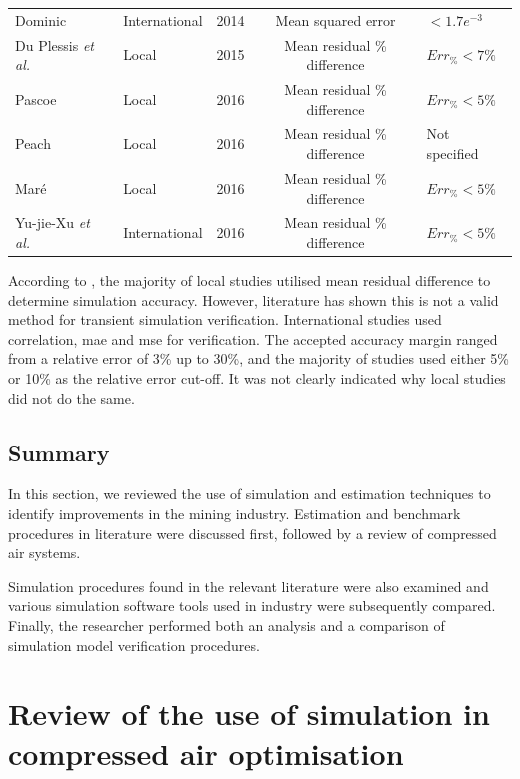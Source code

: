\begin{table}[h]
\begin{tabular}{p{3.9cm}p{2.1cm}p{0.8cm}cl}
 			Dominic \cite{dominic2014dynamic}& International					& 2014 & Mean squared error & $<1.7e^{-3}$	\\
 			Du Plessis \textit{et al.}\cite{du2015development} & Local	& 2015 & Mean residual \% difference & $Err_{\%} <7\%$ \\
 			Pascoe \cite{Pascoe2016Masters} & Local 					& 2016 & Mean residual \% difference & $Err_{\%} <5\%$ \\	
 			Peach \cite{Peach2016Masters}	& Local					& 2016 & Mean residual \% difference & Not specified\\
 			Maré \cite{Mare2016PhD} 	& Local						& 2016 & Mean residual \% difference & $Err_{\%} <5\%$  \\	
 			Yu-jie-Xu \textit{et al.} \cite{xu2016modeling} & International		& 2016 & Mean residual \% difference & $Err_{\%} <5\%$ \\
 			\hline
 		\end{tabular}  		
 		\label{table: Verification studies}
 	\end{table}
	\par 
 	 According to , the majority of local studies utilised mean residual difference to determine simulation accuracy. However, literature has shown this is not a valid method for transient simulation verification. International studies used correlation, \gls{mae} and \gls{mse} for verification. The accepted accuracy margin ranged from a relative error of 3\% up to 30\%, and the majority of studies used either 5\% or 10\%  as the relative error cut-off. It was not clearly indicated why local studies did not do the same.
 
 	\subsection{Summary}
 	In this section, we reviewed the use of simulation and estimation techniques to identify improvements in the mining industry. Estimation and benchmark procedures in literature were discussed first, followed by a review of compressed air systems.
 	
 	Simulation procedures found in the relevant literature were also examined and various simulation software tools used in industry were subsequently compared. Finally, the researcher performed both an analysis and a comparison of simulation model verification procedures.
\section{Review of the use of simulation in compressed air optimisation}
\label{CompressorSimulation Literature} \label{simplfiedModels}
